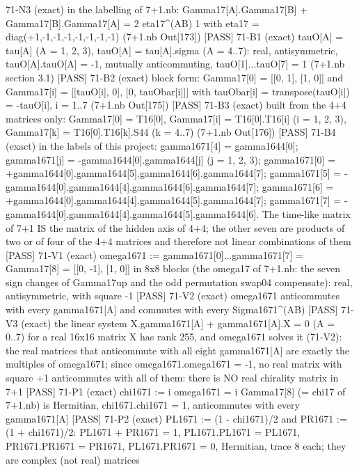 \documentclass[
  10pt,
]{article}
\newenvironment{Shaded}{}{}
\newcommand{\NormalTok}[1]{#1}
\begin{document}
\begin{Shaded}
\begin{Highlighting}[]
\NormalTok{[PASS] 71{-}N3  (exact) in the labelling of 7+1.nb: Gamma17[A].Gamma17[B] + Gamma17[B].Gamma17[A] = 2 eta17\^{}(AB) 1 with eta17 = diag(+1,{-}1,{-}1,{-}1,{-}1,{-}1,{-}1,{-}1) (7+1.nb Out[173])}
\NormalTok{[PASS] 71{-}B1  (exact) tauO[A] = tau[A] (A = 1, 2, 3), tauO[A] = tau[A].sigma (A = 4..7): real, antisymmetric, tauO[A].tauO[A] = {-}1, mutually anticommuting, tauO[1]...tauO[7] = 1 (7+1.nb section 3.1)}
\NormalTok{[PASS] 71{-}B2  (exact) block form: Gamma17[0] = [[0, 1], [1, 0]] and Gamma17[i] = [[tauO[i], 0], [0, tauObar[i]]] with tauObar[i] = transpose(tauO[i]) = {-}tauO[i], i = 1..7 (7+1.nb Out[175])}
\NormalTok{[PASS] 71{-}B3  (exact) built from the 4+4 matrices only: Gamma17[0] = T16[0], Gamma17[i] = T16[0].T16[i] (i = 1, 2, 3), Gamma17[k] = T16[0].T16[k].S44 (k = 4..7) (7+1.nb Out[176])}
\NormalTok{[PASS] 71{-}B4  (exact) in the labels of this project: gamma1671[4] = gamma1644[0]; gamma1671[j] = {-}gamma1644[0].gamma1644[j] (j = 1, 2, 3); gamma1671[0] = +gamma1644[0].gamma1644[5].gamma1644[6].gamma1644[7]; gamma1671[5] = {-}gamma1644[0].gamma1644[4].gamma1644[6].gamma1644[7]; gamma1671[6] = +gamma1644[0].gamma1644[4].gamma1644[5].gamma1644[7]; gamma1671[7] = {-}gamma1644[0].gamma1644[4].gamma1644[5].gamma1644[6].  The time{-}like matrix of 7+1 IS the matrix of the hidden axis of 4+4; the other seven are products of two or of four of the 4+4 matrices and therefore not linear combinations of them}
\NormalTok{[PASS] 71{-}V1  (exact) omega1671 := gamma1671[0]...gamma1671[7] = Gamma17[8] = [[0, {-}1], [1, 0]] in 8x8 blocks (the omega17 of 7+1.nb: the seven sign changes of Gamma17up and the odd permutation swap04 compensate): real, antisymmetric, with square {-}1}
\NormalTok{[PASS] 71{-}V2  (exact) omega1671 anticommutes with every gamma1671[A] and commutes with every Sigma1671\^{}(AB)}
\NormalTok{[PASS] 71{-}V3  (exact) the linear system X.gamma1671[A] + gamma1671[A].X = 0 (A = 0..7) for a real 16x16 matrix X has rank 255, and omega1671 solves it (71{-}V2): the real matrices that anticommute with all eight gamma1671[A] are exactly the multiples of omega1671; since omega1671.omega1671 = {-}1, no real matrix with square +1 anticommutes with all of them: there is NO real chirality matrix in 7+1}
\NormalTok{[PASS] 71{-}P1  (exact) chi1671 := i omega1671 = i Gamma17[8] (= chi17 of 7+1.nb) is Hermitian, chi1671.chi1671 = 1, anticommutes with every gamma1671[A]}
\NormalTok{[PASS] 71{-}P2  (exact) PL1671 := (1 {-} chi1671)/2 and PR1671 := (1 + chi1671)/2: PL1671 + PR1671 = 1, PL1671.PL1671 = PL1671, PR1671.PR1671 = PR1671, PL1671.PR1671 = 0, Hermitian, trace 8 each; they are complex (not real) matrices}

\end{Highlighting}
\end{Shaded}
\end{document}
